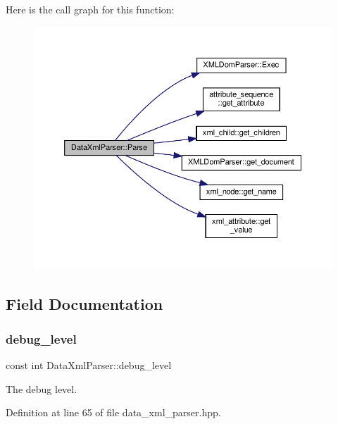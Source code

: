 Here is the call graph for this function\+:
\nopagebreak
\begin{figure}[H]
\begin{center}
\leavevmode
\includegraphics[width=350pt]{d9/db6/classDataXmlParser_a3f071ae4083e3a512e771502f89c7fab_cgraph}
\end{center}
\end{figure}


\subsection{Field Documentation}
\mbox{\label{classDataXmlParser_ae22bf236ffba691665a432b0150c14e8}} 
\subsubsection{\texorpdfstring{debug\+\_\+level}{debug\_level}}
{\footnotesize\ttfamily const int Data\+Xml\+Parser\+::debug\+\_\+level\hspace{0.3cm}{\ttfamily [private]}}



The debug level. 



Definition at line 65 of file data\+\_\+xml\+\_\+parser.\+hpp.

\mbox{\label{classDataXmlParser_a3a2edee0d7d535f8e014154f791d1055}} 
